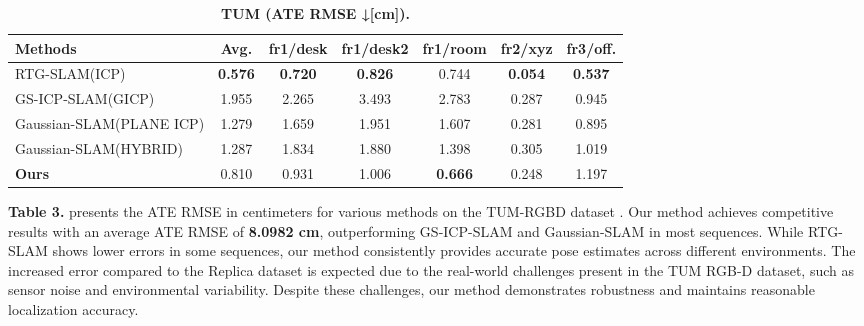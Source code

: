 \documentclass[twocolumn]{article}
\begin{document}
\begin{table}[htbp]
\renewcommand{\thetable}{\textbf{\arabic{table}}}
\renewcommand{\tablename}{\textbf{Table}}
\centering
\caption{\textbf{TUM\cite{sturmBenchmarkEvaluationRGBD2012} (ATE RMSE ↓[cm]).}}
\label{table:_textbf_tum_cite_stu}
\begin{adjustbox}{max width=\columnwidth,max height=!,center}
\begin{tabular}{lcccccc}
\toprule
\textbf{Methods} & \textbf{Avg.} & \textbf{fr1/desk} & \textbf{fr1/desk2} & \textbf{fr1/room} & \textbf{fr2/xyz} & \textbf{fr3/off.}\\
\midrule
RTG-SLAM(ICP)\cite{pengRTGSLAMRealtime3D2024} & \cellcolor{green!30}\textbf{0.576} & \cellcolor{green!30}\textbf{0.720} & \cellcolor{green!30}\textbf{0.826} & \cellcolor{yellow!30}0.744 & \cellcolor{green!30}\textbf{0.054} & \cellcolor{green!30}\textbf{0.537}\\
GS-ICP-SLAM(GICP)\cite{haRGBDGSICPSLAM2024} & 1.955 & 2.265 & 3.493 & 2.783 & 0.287 & \cellcolor{lime!50}0.945\\
Gaussian-SLAM(PLANE ICP)\cite{yugayGaussianSLAMPhotorealisticDense2024} & \cellcolor{lime!50}1.279 & \cellcolor{lime!50}1.659 & 1.951 & 1.607 & \cellcolor{lime!50}0.281 & \cellcolor{yellow!30}0.895\\
Gaussian-SLAM(HYBRID)\cite{yugayGaussianSLAMPhotorealisticDense2024} & 1.287 & 1.834 & \cellcolor{lime!50}1.880 & \cellcolor{lime!50}1.398 & 0.305 & 1.019\\
\midrule
\textbf{Ours} & \cellcolor{yellow!30}0.810 & \cellcolor{yellow!30}0.931 & \cellcolor{yellow!30}1.006 & \cellcolor{green!30}\textbf{0.666} & \cellcolor{yellow!30}0.248 & 1.197\\
\bottomrule
\end{tabular}
\end{adjustbox}
\end{table}

\textbf{Table 3.} presents the ATE RMSE in centimeters for various
methods on the TUM-RGBD dataset . Our method achieves competitive
results with an average ATE RMSE of \textbf{8.0982 cm}, outperforming
GS-ICP-SLAM\autocite{haRGBDGSICPSLAM2024} and
Gaussian-SLAM\autocite{yugayGaussianSLAMPhotorealisticDense2024} in most
sequences. While RTG-SLAM\autocite{pengRTGSLAMRealtime3D2024} shows
lower errors in some sequences, our method consistently provides
accurate pose estimates across different environments. The increased
error compared to the Replica dataset is expected due to the real-world
challenges present in the TUM RGB-D
dataset\autocite{sturmBenchmarkEvaluationRGBD2012}, such as sensor noise
and environmental variability. Despite these challenges, our method
demonstrates robustness and maintains reasonable localization accuracy.
\end{document}
